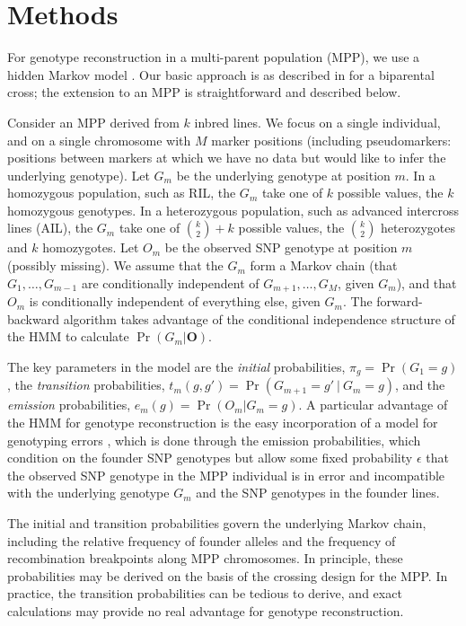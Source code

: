 \documentclass[12pt,letterpaper]{article}\usepackage[]{graphicx}\usepackage[table]{xcolor}
\begin{document}
\clearpage

\section*{Methods}


For genotype reconstruction in a multi-parent population (MPP), we use a
hidden Markov model \citep[HMM; see][]{rabiner1989}. Our basic approach
is as described in \citet[App. D]{rqtlbook} for a biparental
cross; the extension to an MPP is straightforward and described below.

Consider an MPP derived from $k$ inbred lines. We focus on a single
individual, and on a single chromosome with $M$ marker positions
(including pseudomarkers: positions between markers at which we have
no data but would like to infer the underlying genotype). Let $G_m$ be
the underlying genotype at position $m$.
In a homozygous population, such as RIL, the $G_m$ take one of $k$
possible values, the $k$ homozygous genotypes.
In a heterozygous population, such as advanced intercross lines (AIL),
the $G_m$ take one of $\binom{k}{2} + k$ possible values, the
$\binom{k}{2}$ heterozygotes and $k$ homozygotes.
Let $O_m$ be the observed SNP genotype at position $m$
(possibly missing). We assume that the $G_m$ form a Markov chain (that
$G_1, \dots, G_{m-1}$ are conditionally independent of $G_{m+1}, \dots,
G_M$, given $G_m$), and that $O_m$ is conditionally independent of
everything else, given $G_m$. The forward-backward algorithm
\citep[see][]{rabiner1989} takes advantage of
the conditional independence structure of the HMM to calculate
$\Pr(G_m | \boldsymbol{O})$.

The key parameters in the model are the \emph{initial\/}
probabilities, $\pi_g = \Pr(G_1 = g)$, the \emph{transition\/}
probabilities, $t_m(g, g') = \Pr(G_{m+1} = g' \ | \ G_m = g)$, and the
\emph{emission\/} probabilities, $e_m(g) = \Pr(O_m | G_m = g)$. A
particular advantage of the HMM for genotype reconstruction is the
easy incorporation of a model for genotyping errors
\citep{lincoln1992}, which is done through the emission probabilities,
which condition on the founder SNP genotypes but allow some fixed
probability $\epsilon$ that the observed SNP genotype in the MPP
individual is in error and incompatible with the underlying genotype
$G_m$ and the SNP genotypes in the founder lines.

The initial and transition probabilities govern the underlying Markov
chain, including the relative frequency of founder alleles and the
frequency of recombination breakpoints along MPP chromosomes. In
principle, these probabilities may be derived on the basis of the
crossing design for the MPP. In practice, the
transition probabilities can be tedious to derive, and exact
calculations may provide no real advantage for genotype
reconstruction.
\end{document}

